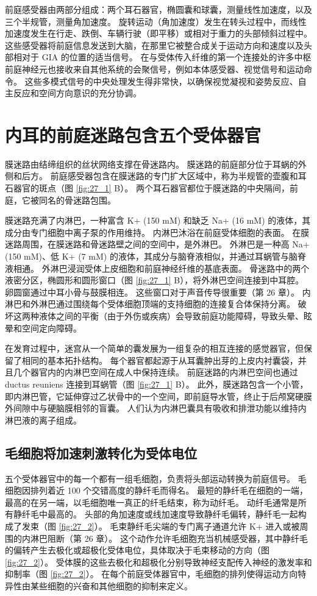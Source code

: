 前庭感受器由两部分组成：两个耳石器官，椭圆囊和球囊，测量线性加速度，以及三个半规管，测量角加速度。 旋转运动（角加速度）发生在转头过程中，而线性加速度发生在行走、跌倒、车辆行驶（即平移）或相对于重力的头部倾斜过程中。 这些感受器将前庭信息发送到大脑，在那里它被整合成关于运动方向和速度以及头部相对于 GIA 的位置的适当信号。 在与受体传入纤维的第一个连接处的许多中枢前庭神经元也接收来自其他系统的会聚信号，例如本体感受器、视觉信号和运动命令。 这些多模式信号的中央处理发生得非常快，以确保视觉凝视和姿势反应、自主反应和空间方向意识的充分协调。

\section{内耳的前庭迷路包含五个受体器官}
膜迷路由结缔组织的丝状网络支撑在骨迷路内。 膜迷路的前庭部分位于耳蜗的外侧和后方。 前庭感受器包含在膜迷路的专门扩大区域中，称为半规管的壶腹和耳石器官的斑点（图 \ref{fig:27_1} B）。 两个耳石器官都位于膜迷路的中央隔间，前庭，它被同名的骨迷路包围。

膜迷路充满了内淋巴，一种富含 K+ (150 mM) 和缺乏 Na+ (16 mM) 的液体，其成分由专门细胞中离子泵的作用维持。 内淋巴沐浴在前庭受体细胞的表面。 在膜迷路周围，在膜迷路和骨迷路壁之间的空间中，是外淋巴。 外淋巴是一种高 Na+ (150 mM)、低 K+ (7 mM) 的液体，其成分与脑脊液相似，并通过耳蜗管与脑脊液相通。 外淋巴浸润受体上皮细胞和前庭神经纤维的基底表面。 骨迷路中的两个液密分区，椭圆形和圆形窗口（图 \ref{fig:27_1} B），将外淋巴空间连接到中耳腔。 卵圆窗通过中耳小骨与鼓膜相连。 这些窗口对于声音传导很重要（第 26 章）。 内淋巴和外淋巴通过围绕每个受体细胞顶端的支持细胞的连接复合体保持分离。 破坏这两种液体之间的平衡（由于外伤或疾病）会导致前庭功能障碍，导致头晕、眩晕和空间定向障碍。

在发育过程中，迷宫从一个简单的囊发展为一组复杂的相互连接的感觉器官，但保留了相同的基本拓扑结构。 每个器官都起源于从耳囊肿出芽的上皮内衬囊袋，并且几个器官内的内淋巴空间在成人中保持连续。 前庭迷路的内淋巴空间也通过 ductus reuniens 连接到耳蜗管（图 \ref{fig:27_1} B）。 此外，膜迷路包含一个小管，即内淋巴管，它延伸穿过乙状骨中的一个空间，即前庭导水管，终止于后颅窝硬膜外间隙中与硬脑膜相邻的盲囊。 人们认为内淋巴囊具有吸收和排泄功能以维持内淋巴液的离子组成。

\subsection{毛细胞将加速刺激转化为受体电位}
五个受体器官中的每一个都有一组毛细胞，负责将头部运动转换为前庭信号。 毛细胞因排列着近 100 个交错高度的静纤毛而得名。 最短的静纤毛在细胞的一端，最高的在另一端，以毛细胞唯一真正的纤毛结束，称为动纤毛。 动纤毛通常是所有静纤毛中最高的。 
头部的角加速度或线加速度导致静纤毛偏转，静纤毛一起构成了发束（图 \ref{fig:27_2}）。 
毛束静纤毛尖端的专门离子通道允许 K+ 进入或被周围的内淋巴阻断（第 26 章）。 
这个动作允许毛细胞充当机械感受器，其中静纤毛的偏转产生去极化或超极化受体电位，具体取决于毛束移动的方向（图 \ref{fig:27_2}）。 
受体膜的这些去极化和超极化分别导致神经支配传入神经的激发率和抑制率（图 \ref{fig:27_2}）。 
在每个前庭受体器官中，毛细胞的排列使得运动方向特异性由某些细胞的兴奋和其他细胞的抑制来定义。

